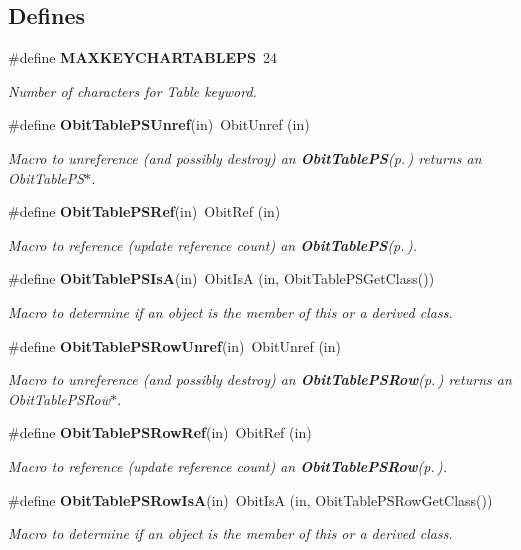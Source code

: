 \subsection*{Defines}
\begin{CompactItemize}
\item 
\#define {\bf MAXKEYCHARTABLEPS}\ 24
\begin{CompactList}\small\item\em Number of characters for Table keyword. \item\end{CompactList}\item 
\#define {\bf Obit\-Table\-PSUnref}(in)\ Obit\-Unref (in)
\begin{CompactList}\small\item\em Macro to unreference (and possibly destroy) an {\bf Obit\-Table\-PS}{\rm (p.\,\pageref{structObitTablePS})} returns an Obit\-Table\-PS$\ast$. \item\end{CompactList}\item 
\#define {\bf Obit\-Table\-PSRef}(in)\ Obit\-Ref (in)
\begin{CompactList}\small\item\em Macro to reference (update reference count) an {\bf Obit\-Table\-PS}{\rm (p.\,\pageref{structObitTablePS})}. \item\end{CompactList}\item 
\#define {\bf Obit\-Table\-PSIs\-A}(in)\ Obit\-Is\-A (in, Obit\-Table\-PSGet\-Class())
\begin{CompactList}\small\item\em Macro to determine if an object is the member of this or a derived class. \item\end{CompactList}\item 
\#define {\bf Obit\-Table\-PSRow\-Unref}(in)\ Obit\-Unref (in)
\begin{CompactList}\small\item\em Macro to unreference (and possibly destroy) an {\bf Obit\-Table\-PSRow}{\rm (p.\,\pageref{structObitTablePSRow})} returns an Obit\-Table\-PSRow$\ast$. \item\end{CompactList}\item 
\#define {\bf Obit\-Table\-PSRow\-Ref}(in)\ Obit\-Ref (in)
\begin{CompactList}\small\item\em Macro to reference (update reference count) an {\bf Obit\-Table\-PSRow}{\rm (p.\,\pageref{structObitTablePSRow})}. \item\end{CompactList}\item 
\#define {\bf Obit\-Table\-PSRow\-Is\-A}(in)\ Obit\-Is\-A (in, Obit\-Table\-PSRow\-Get\-Class())
\begin{CompactList}\small\item\em Macro to determine if an object is the member of this or a derived class. \item\end{CompactList}\end{CompactItemize}
